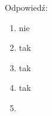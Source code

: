 Odpowiedź:
\begin{enumerate}
    \item nie
    \item tak
    \item tak
    \item tak
    \item 
\end{enumerate}